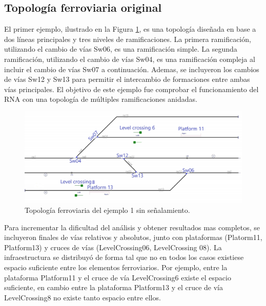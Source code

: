 \subsection{Topología ferroviaria original}

	El primer ejemplo, ilustrado en la Figura \ref{fig:EJ1_1}, es una topología diseñada en base a dos líneas principales y tres niveles de ramificaciones. La primera ramificación, utilizando el cambio de vías Sw06, es una ramificación simple. La segunda ramificación, utilizando el cambio de vías Sw04, es una ramificación compleja al incluir el cambio de vías Sw07 a continuación. Ademas, se incluyeron los cambios de vías Sw12 y Sw13 para permitir el intercambio de formaciones entre ambas vías principales. El objetivo de este ejemplo fue comprobar el funcionamiento del RNA con una topología de múltiples ramificaciones anidadas.
	
	\begin{figure}[h]
		\centering
		\includegraphics[width=1\textwidth]{resultados-obtenidos/ejemplo1/images/1_empty.png}
		\centering\caption{Topología ferroviaria del ejemplo 1 sin señalamiento.}
		\label{fig:EJ1_1}
	\end{figure}
	
	Para incrementar la dificultad del análisis y obtener resultados mas completos, se incluyeron finales de vías relativos y absolutos, junto con plataformas (Platorm11, Platform13) y cruces de vías (LevelCrossing06, LevelCrossing 08). La infraestructura se distribuyó de forma tal que no en todos los casos existiese espacio suficiente entre los elementos ferroviarios. Por ejemplo, entre la plataforma Platform11 y el cruce de vía LevelCrossing6 existe el espacio suficiente, en cambio entre la plataforma Platform13 y el cruce de vía LevelCrossing8 no existe tanto espacio entre ellos.